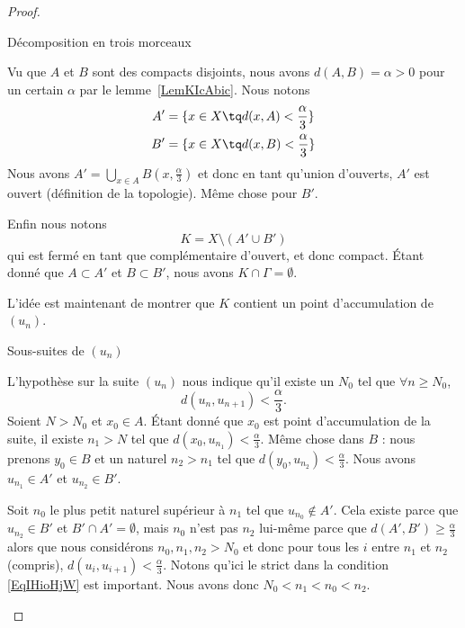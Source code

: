 \begin{proof}
\begin{subproof}
		\item[Décomposition en trois morceaux]

		Vu que \( A\) et \( B\) sont des compacts disjoints, nous avons \( d(A,B)=\alpha>0\) pour un certain \( \alpha\) par le lemme~\ref{LemKIcAbic}. Nous notons
		\begin{subequations}
			\begin{align}
				A' & =\{x\in X\tq d(x,A)<\frac{ \alpha }{ 3 }\} \\
				B' & =\{x\in X\tq d(x,B)<\frac{ \alpha }{ 3 }\}
			\end{align}
		\end{subequations}
		Nous avons \( A'=\bigcup_{x\in A}B(x,\frac{ \alpha }{ 3 })\) et donc en tant qu'union d'ouverts, \( A'\) est ouvert (définition de la topologie). Même chose pour \( B'\).

		Enfin nous notons
		\begin{equation}
			K=X\setminus(A'\cup B')
		\end{equation}
		qui est fermé en tant que complémentaire d'ouvert, et donc compact. Étant donné que \( A\subset A'\) et \( B\subset B' \), nous avons \( K\cap \Gamma=\emptyset\).

		L'idée est maintenant de montrer que \( K\) contient un point d'accumulation de \( (u_n)\).

		\item[Sous-suites de \( (u_n)\)]

		L'hypothèse sur la suite \( (u_n)\) nous indique qu'il existe un \( N_0\) tel que \( \forall n\geq N_0\),
		\begin{equation}    \label{EqIHioHjW}
			d(u_{n},u_{n+1})<\frac{ \alpha }{ 3 }.
		\end{equation}
		Soient \( N>N_0 \) et \( x_0\in A\). Étant donné que \( x_0\) est point d'accumulation de la suite, il existe \( n_1>N\) tel que \( d(x_0,u_{n_1})<\frac{ \alpha }{ 3 }\). Même chose dans \( B\) : nous prenons \( y_0\in B\) et un naturel \( n_2>n_1\) tel que \( d(y_0,u_{n_2})<\frac{ \alpha }{ 3 }\). Nous avons \( u_{n_1}\in A'\) et \( u_{n_2}\in B'\).

		Soit \( n_0\) le plus petit naturel supérieur à \( n_1\) tel que \( u_{n_0}\notin A'\). Cela existe parce que \( u_{n_2}\in B'\) et \( B'\cap A'=\emptyset\), mais \( n_0\) n'est pas \( n_2\) lui-même parce que \( d(A',B')\geq \frac{ \alpha }{ 3 }\) alors que nous considérons \( n_0,n_1,n_2>N_0\) et donc pour tous les \( i\) entre \( n_1\) et \( n_2\) (compris), \( d(u_i,u_{i+1})<\frac{ \alpha }{ 3 }\). Notons qu'ici le strict dans la condition \eqref{EqIHioHjW} est important. Nous avons donc \(N_0<n_1<n_0<n_2\).


\end{subproof}
\end{proof}
